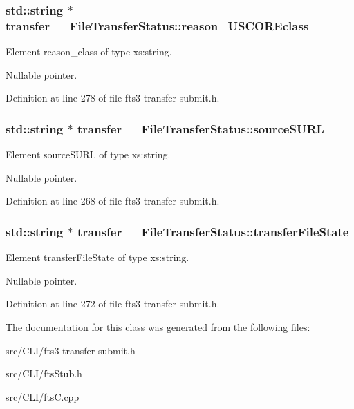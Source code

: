 \subsubsection[{reason\_\-USCOREclass}]{\setlength{\rightskip}{0pt plus 5cm}std::string $\ast$ {\bf transfer\_\-\_\-FileTransferStatus::reason\_\-USCOREclass}}\label{classtransfer____FileTransferStatus_a0b9fa91c980937fa104d377a84147dd7}


Element reason\_\-class of type xs:string. 

Nullable pointer. 

Definition at line 278 of file fts3-\/transfer-\/submit.h.

\subsubsection[{sourceSURL}]{\setlength{\rightskip}{0pt plus 5cm}std::string $\ast$ {\bf transfer\_\-\_\-FileTransferStatus::sourceSURL}}\label{classtransfer____FileTransferStatus_a290772d67cc660d332400efa839b2081}


Element sourceSURL of type xs:string. 

Nullable pointer. 

Definition at line 268 of file fts3-\/transfer-\/submit.h.

\subsubsection[{transferFileState}]{\setlength{\rightskip}{0pt plus 5cm}std::string $\ast$ {\bf transfer\_\-\_\-FileTransferStatus::transferFileState}}\label{classtransfer____FileTransferStatus_a87df9ec0e5ec3d6881ef5b95088a77e7}


Element transferFileState of type xs:string. 

Nullable pointer. 

Definition at line 272 of file fts3-\/transfer-\/submit.h.



The documentation for this class was generated from the following files:\begin{DoxyCompactItemize}
\item 
src/CLI/fts3-\/transfer-\/submit.h\item 
src/CLI/ftsStub.h\item 
src/CLI/ftsC.cpp\end{DoxyCompactItemize}
